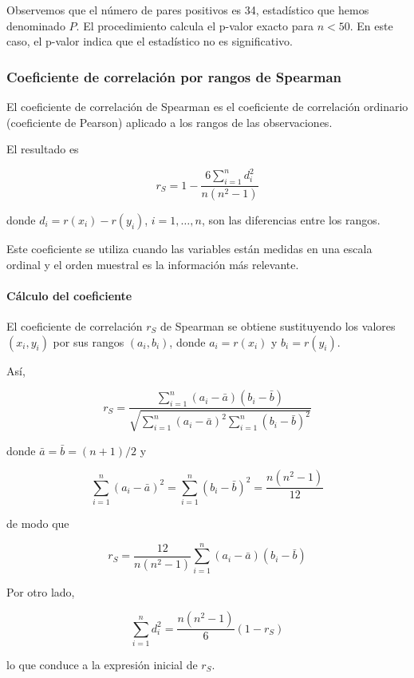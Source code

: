 \documentclass[
]{article}
\begin{document}
Observemos que el número de pares positivos es 34, estadístico que hemos denominado \(P\).
El procedimiento calcula el p-valor exacto para \(n<50\). En este caso, el p-valor indica que el estadístico no es significativo.

\subsubsection{Coeficiente de correlación por rangos de Spearman}\label{coeficiente-de-correlaciuxf3n-por-rangos-de-spearman}

El coeficiente de correlación de Spearman es el coeficiente de correlación ordinario (coeficiente de Pearson) aplicado a los rangos de las observaciones.

El resultado es

\[
r_{S}=1-\frac{6 \sum_{i=1}^{n} d_{i}^{2}}{n(n^{2}-1)}
\]

donde \(d_{i}=r(x_{i})-r(y_{i})\), \(i=1, \ldots, n\), son las diferencias entre los rangos.

Este coeficiente se utiliza cuando las variables están medidas en una escala ordinal y el orden muestral es la información más relevante.

\paragraph{Cálculo del coeficiente}\label{cuxe1lculo-del-coeficiente}

El coeficiente de correlación \(r_{S}\) de Spearman se obtiene sustituyendo los valores \((x_{i},y_{i})\) por sus rangos \((a_{i},b_{i})\), donde \(a_{i}=r(x_{i})\) y \(b_{i}=r(y_{i})\).

Así,

\[
r_{S}=\frac{\sum_{i=1}^{n}(a_{i}-\bar a)(b_{i}-\bar b)}{\sqrt{\sum_{i=1}^{n}(a_{i}-\bar a)^{2}\sum_{i=1}^{n}(b_{i}-\bar b)^{2}}}
\]

donde \(\bar a=\bar b=(n+1)/2\) y

\[
\sum_{i=1}^{n}(a_{i}-\bar a)^{2}=\sum_{i=1}^{n}(b_{i}-\bar b)^{2}=\frac{n(n^{2}-1)}{12}
\]

de modo que

\[
r_{S}=\frac{12}{n(n^{2}-1)}\sum_{i=1}^{n}(a_{i}-\bar a)(b_{i}-\bar b)
\]

Por otro lado,

\[
\sum_{i=1}^{n} d_{i}^{2}=\frac{n(n^{2}-1)}{6}(1-r_{S})
\]

lo que conduce a la expresión inicial de \(r_{S}\).
\end{document}
